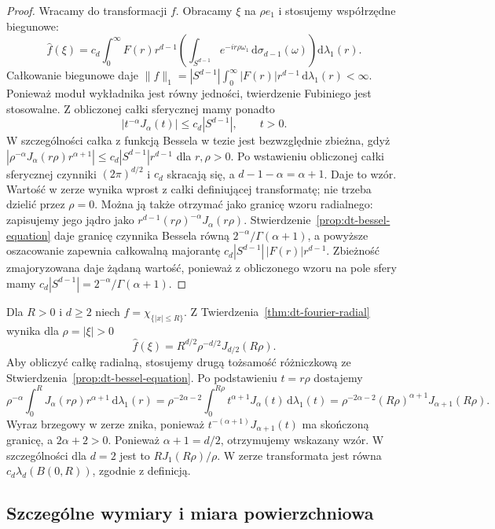 \begin{proof}
Wracamy do transformacji $f$. Obracamy $\xi$ na
$\rho e_1$ i stosujemy współrzędne biegunowe:
\[
 \widehat f(\xi)=c_d\int_0^\infty F(r)r^{d-1}
 \left(\int_{S^{d-1}}e^{-ir\rho\omega_1}
 \,\mathrm d\sigma_{d-1}(\omega)\right)\mathrm d\lambda_1(r).
\]
Całkowanie biegunowe daje
$\|f\|_1=|S^{d-1}|\int_0^\infty|F(r)|r^{d-1}\,
\mathrm d\lambda_1(r)<\infty$.
Ponieważ moduł wykładnika jest równy jedności,
twierdzenie Fubiniego jest stosowalne.
Z obliczonej całki sferycznej mamy ponadto
\[
 |t^{-\alpha}J_\alpha(t)|\le c_d|S^{d-1}|,
 \qquad t>0.
\]
W szczególności całka z funkcją Bessela w tezie
jest bezwzględnie zbieżna, gdyż
$|\rho^{-\alpha}J_\alpha(r\rho)r^{\alpha+1}|
\le c_d|S^{d-1}|r^{d-1}$ dla $r,\rho>0$.
Po wstawieniu obliczonej całki sferycznej
czynniki $(2\pi)^{d/2}$ i $c_d$ skracają się, a
$d-1-\alpha=\alpha+1$. Daje to wzór.
Wartość w zerze wynika wprost z całki definiującej
transformatę; nie trzeba dzielić przez $\rho=0$.
Można ją także otrzymać jako granicę wzoru radialnego:
zapisujemy jego jądro jako
$r^{d-1}(r\rho)^{-\alpha}J_\alpha(r\rho)$.
Stwierdzenie~\ref{prop:dt-bessel-equation} daje granicę
czynnika Bessela równą $2^{-\alpha}/\Gamma(\alpha+1)$,
a powyższe oszacowanie zapewnia całkowalną majorantę
$c_d|S^{d-1}|\,|F(r)|r^{d-1}$.
Zbieżność zmajoryzowana daje żądaną wartość, ponieważ
z obliczonego wzoru na pole sfery mamy
$c_d|S^{d-1}|=2^{-\alpha}/\Gamma(\alpha+1)$.
\end{proof}

\begin{przyklad}
\label{ex:dt-fourier-ball}
Dla $R>0$ i $d\ge2$ niech $f=\chi_{\{|x|\le R\}}$.
Z Twierdzenia~\ref{thm:dt-fourier-radial} wynika dla
$\rho=|\xi|>0$
\[
 \widehat f(\xi)=R^{d/2}\rho^{-d/2}J_{d/2}(R\rho).
\]
Aby obliczyć całkę radialną, stosujemy drugą
tożsamość różniczkową ze
Stwierdzenia~\ref{prop:dt-bessel-equation}.
Po podstawieniu $t=r\rho$ dostajemy
\[
 \rho^{-\alpha}\int_0^R J_\alpha(r\rho)r^{\alpha+1}
 \,\mathrm d\lambda_1(r)
 =\rho^{-2\alpha-2}\int_0^{R\rho}t^{\alpha+1}
 J_\alpha(t)\,\mathrm d\lambda_1(t)
 =\rho^{-2\alpha-2}(R\rho)^{\alpha+1}J_{\alpha+1}(R\rho).
\]
Wyraz brzegowy w zerze znika, ponieważ
$t^{-(\alpha+1)}J_{\alpha+1}(t)$ ma skończoną
granicę, a $2\alpha+2>0$. Ponieważ $\alpha+1=d/2$,
otrzymujemy wskazany wzór. W szczególności dla $d=2$
jest to $R J_1(R\rho)/\rho$. W zerze transformata jest
równa $c_d\lambda_d(B(0,R))$, zgodnie z definicją.
\end{przyklad}


\subsection{Szczególne wymiary i miara powierzchniowa}


